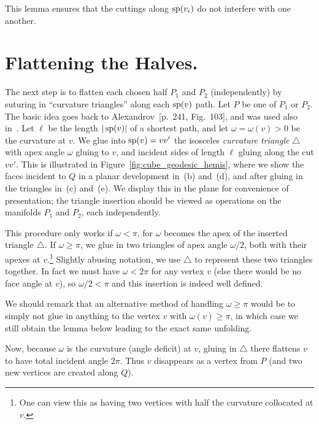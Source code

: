 \pdfoutput=1  \documentclass[]{article}
\newcommand{\figref}[1]{\ref{fig:#1}}
\def\o{{\omega}}
\def\sp{\mathop{\rm sp}\nolimits}
\begin{document}
This lemma ensures that the cuttings along $\sp(v_i)$ do not interfere
with one another.



\section{Flattening the Halves.}
The next step is to flatten each chosen
half $P_1$ and $P_2$ (independently) 
by suturing in ``curvature triangles''
along each $\sp(v)$ path.
Let $P$ be one of $P_1$ or $P_2$.
The basic idea goes back to Alexandrov~\cite{a-cp-05}[p.~241, Fig.~103],
and was used also in~\cite{iv-cfpcs-08}.
Let $\ell$ be the length $|\sp(v)|$ of a shortest path,
and let $\o=\o(v)> 0 $ be the curvature at $v$.
We glue into $\sp(v)=v v'$ the isosceles \emph{curvature triangle}
$\triangle$ with apex angle $\o$ gluing
to $v$,
and incident sides of length $\ell$ gluing along the cut $v v'$. This is illustrated in
Figure~\figref{cube_geodesic_hemis}, where we show the faces
incident to $Q$ in a planar development in~(b) and~(d),
and after gluing in the triangles in~(c) and~(e).
We display this in the plane for convenience of presentation;
the triangle insertion should be viewed as operations on the manifolds
$P_1$ and $P_2$, each independently.


This procedure only works if $\o < \pi$, for $\o$ becomes the apex of the
inserted triangle $\triangle$.
If $\o \ge \pi$, we glue in two triangles of apex angle $\o/2$, both with their
apexes at $v$.\footnote{
   One can view this as having two vertices with half
   the curvature collocated at $v$.
}
Slightly abusing notation, we use $\triangle$ to represent
these two triangles together.  
In fact we must have $\o < 2\pi$ for any vertex $v$
(else there would be no face angle at $v$),
so $\o/2 < \pi$ and this insertion is indeed well defined.

We should remark that an alternative method of handling $\o \ge \pi$
would be to simply not glue in anything to the 
vertex $v$ with $\o(v) \ge \pi$, in which
case we still obtain the lemma below leading to the exact same unfolding.

Now, because $\o$ is the curvature (angle deficit) at $v$, gluing in $\triangle$
there flattens $v$ to have total incident angle $2\pi$.
Thus $v$ disappears as a vertex from $P$ (and two new vertices are created along $Q$).
\end{document}
